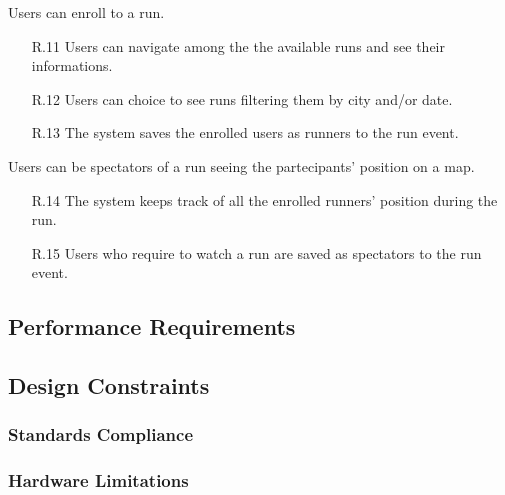 \documentclass[a4paper]{article}
\begin{document}
\begin{enumerate}[label*={[G.\arabic*]}]
\begin{enumerate}
        \end{enumerate}
	
	\item Users can enroll to a run.
	
		\begin{enumerate}
            
            \item [R.11] Users can navigate among the the available runs and see their informations.
            \item [R.12] Users can choice to see runs filtering them by city and/or date. 
            \item [R.13] The system saves the enrolled users as runners to the run event.
	                
        \end{enumerate}
	
	\item Users can be spectators of a run seeing the partecipants' position on a map.
	
			\begin{enumerate}
            
                \item [R.14] The system keeps track of all the enrolled runners' position during the run.
                \item [R.15] Users who require to watch a run are saved as spectators to the run event.
            
        \end{enumerate}
	
\end{enumerate}

\subsection{Performance Requirements}

\subsection{Design Constraints}

\subsubsection{Standards Compliance}

\subsubsection{Hardware Limitations}
\end{document}
